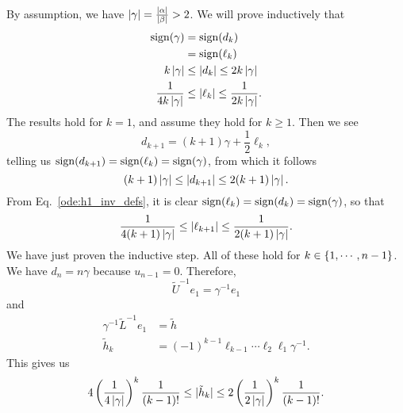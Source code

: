 \noindent
By assumption, we have $\left| \gamma \right| = \frac{\left| \alpha \right|}{\left| \beta \right|} > 2$.
We will prove inductively that
%
\begin{align}
    \operatorname{sign}(\gamma) &= \operatorname{sign}(d_{k}) \nonumber\\
        &= \operatorname{sign}(\ell_{k}) \nonumber\\
    k\left| \gamma \right| &\le \left| d_{k} \right| \le 2k\left| \gamma \right| \nonumber\\
    \frac{1}{4k\left| \gamma \right|} &\le \left| \ell_{k} \right|
        \le \frac{1}{2k\left| \gamma \right|}.
\end{align}
%
The results hold for $k=1$, and assume they hold for $k\ge1$.
Then we see
%
\begin{equation}
    d_{k+1} = (k+1)\gamma + \frac{1}{2}\ell_{k},
\end{equation}
%
telling us $\operatorname{sign}(d_{k+1}) = \operatorname{sign}(\ell_{k}) = \operatorname{sign}(\gamma)$,
from which it follows
%
\begin{equation}
    (k+1)\left| \gamma \right| \le \left| d_{k+1} \right| \le 2(k+1)\left| \gamma \right|.
\end{equation}
%
From Eq.~\eqref{ode:h1_inv_defs}, it is clear
$\operatorname{sign}(\ell_{k}) = \operatorname{sign}(d_{k}) = \operatorname{sign}(\gamma)$, so that
%
\begin{equation}
    \frac{1}{4(k+1)\left| \gamma \right|} \le \left| \ell_{k+1} \right|
        \le \frac{1}{2(k+1)\left| \gamma \right|}.
\end{equation}
%
We have just proven the inductive step.
All of these hold for $k\in\left\{ 1,\cdots,n-1 \right\}$.
We have $d_{n} = n\gamma$ because $u_{n-1} = 0$.
Therefore,
%
\begin{equation}
    \widetilde{U}^{-1}e_{1} = \gamma^{-1}e_{1}
\end{equation}
%
and
%
\begin{align}
    \gamma^{-1}\widetilde{L}^{-1}e_{1} &= \tilde{h} \nonumber\\
    \tilde{h}_{k} &= (-1)^{k-1}\ell_{k-1}\cdots\ell_{2}\ell_{1}\gamma^{-1}.
\end{align}
%
This gives us
%
\begin{equation}
    4\left( \frac{1}{4\left| \gamma \right|} \right)^{k}\frac{1}{(k-1)!} \le
    |\tilde{h}_{k}| \le 2\left( \frac{1}{2\left| \gamma \right|} \right)^{k}\frac{1}{(k-1)!}.
\end{equation}

